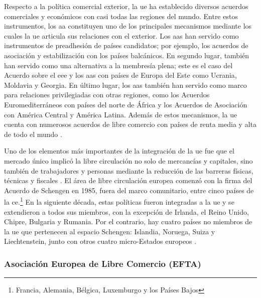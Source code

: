 Respecto a la política comercial exterior, la \gls{ue} ha establecido diversos acuerdos comerciales y económicos con casi todas las regiones del mundo. Entre estos instrumentos, los \gls{aa} constituyen uno de los principales mecanismos mediante los cuales la \gls{ue} articula sus relaciones con el exterior. Los \glspl{aa} han servido como instrumentos de preadhesión de países candidatos; por ejemplo, los acuerdos de asociación y estabilización con los países balcánicos. En segundo lugar, también han servido como una alternativa a la membresía plena; este es el caso del Acuerdo sobre el \gls{eee} y los \glspl{aa} con países de Europa del Este como Ucrania, Moldavia y Georgia. En último lugar, los \glspl{aa} también han servido como marco para relaciones privilegiadas con otras regiones, como los Acuerdos Euromediterráneos con países del norte de África y los Acuerdos de Asociación con América Central y América Latina. Además de estos mecanismos, la \gls{ue} cuenta con numerosos acuerdos de libre comercio con países de renta media y alta de todo el mundo \parencite[p.~57]{Kollarik2025}. 

Uno de los elementos más importantes de la integración de la \gls{ue} fue que el mercado único implicó la libre circulación no solo de mercancías y capitales, sino también de trabajadores y personas mediante la reducción de las barreras físicas, técnicas y fiscales \parencite[p.~53]{Kollarik2025}. El área de libre circulación europea comenzó con la firma del Acuerdo de Schengen en 1985, fuera del marco comunitario, entre cinco países de la \gls{ce}.\footnote{Francia, Alemania, Bélgica, Luxemburgo y los Países Bajos} En la siguiente década, estas políticas fueron integradas a la \gls{ue} y se extendieron a todos sus miembros, con la excepción de Irlanda, el Reino Unido, Chipre, Bulgaria y Rumania. Por el contrario, hay cuatro países no miembros de la \gls{ue} que pertenecen al espacio Schengen: Islandia, Noruega, Suiza y Liechtenstein, junto con otros cuatro micro-Estados europeos \parencite[p.~3]{Leuffen2022}.

\subsubsection{Asociación Europea de Libre Comercio (EFTA)}

